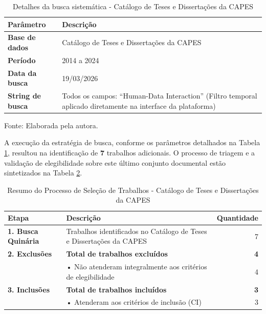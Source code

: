 \documentclass[
	12pt,				%
	oneside,			%
	a4paper,			%
	english,			%
	brazil				%
	]{abntex2ppgsi}
\begin{document}
\begin{table}[htbp]
\centering
\caption{Detalhes da busca sistemática - Catálogo de Teses e Dissertações da CAPES}
\label{tab:detalhes_busca_teses_capes}
\renewcommand{\arraystretch}{1.4} 
\begin{tabular}{@{} >{\bfseries}p{3.5cm} p{11cm} @{}}
\toprule
Parâmetro & Descrição \\
\midrule
Base de dados & Catálogo de Teses e Dissertações da CAPES \\
Período & 2014 a 2024 \\
Data da busca & 19/03/2026 \\
String de busca & Todos os campos: ``Human-Data Interaction'' (Filtro temporal aplicado diretamente na interface da plataforma) \\
\bottomrule
\end{tabular}

\vspace{0.2cm} 
{\small Fonte: Elaborada pela autora.}
\end{table}

A execução da estratégia de busca, conforme os parâmetros detalhados na Tabela \ref{tab:detalhes_busca_teses_capes}, resultou na identificação de \textbf{7} trabalhos adicionais. O processo de triagem e a validação de elegibilidade sobre este último conjunto documental estão sintetizados na Tabela \ref{tab:resumo_selecao_CatalogoTeses_Capes}.

\clearpage

\begin{table}[h]
\centering
\caption{Resumo do Processo de Seleção de Trabalhos - Catálogo de Teses e Dissertações da CAPES}
\label{tab:resumo_selecao_CatalogoTeses_Capes}
\begin{tabularx}{\textwidth}{lXr}
\toprule
\textbf{Etapa} & \textbf{Descrição} & \textbf{Quantidade} \\
\midrule
\textbf{1. Busca Quinária} & Trabalhos identificados no Catálogo de Teses e Dissertações da CAPES & 7 \\
\midrule
\textbf{2. Exclusões} & \textbf{Total de trabalhos excluídos} & \textbf{4} \\
& \hspace{0.5cm}• Não atenderam integralmente aos critérios de elegibilidade & 4 \\
\midrule
\textbf{3. Inclusões} & \textbf{Total de trabalhos incluídos} & \textbf{3} \\
& \hspace{0.5cm}• Atenderam aos critérios de inclusão (CI) & 3 \\
\bottomrule
\end{tabularx}
\end{table}
\end{document}
